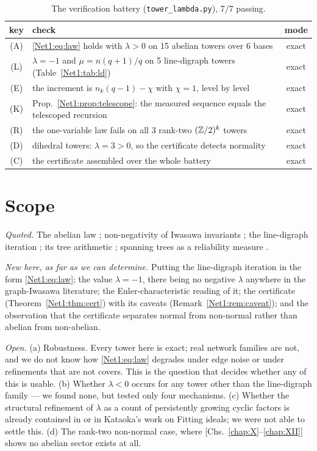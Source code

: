 \begin{table}[ht]
\centering\small
\begin{tabular}{clc}
\toprule
key & check & mode\\
\midrule
(A) & \eqref{Net1:eq:law} holds with $\lambda>0$ on 15 abelian towers over 6 bases & exact\\
(L) & $\lambda=-1$ and $\mu=n(q{+}1)/q$ on 5 line-digraph towers (Table~\ref{Net1:tab:ld}) & exact\\
(E) & the increment is $n_k(q-1)-\chi$ with $\chi=1$, level by level & exact\\
(K) & Prop.~\ref{Net1:prop:telescope}: the measured sequence equals the telescoped recursion & exact\\
(R) & the one-variable law fails on all 3 rank-two $(\mathbb{Z}/2)^{k}$ towers & exact\\
(D) & dihedral towers: $\lambda=3>0$, so the certificate detects normality & exact\\
(C) & the certificate assembled over the whole battery & exact\\
\bottomrule
\end{tabular}
\caption{The verification battery (\texttt{tower\_lambda.py}), $7/7$ passing.}
\label{Net1:tab:battery}
\end{table}

\section{Scope}\label{Net1:sec:scope}

\emph{Quoted.} The abelian law \cite{Val21,MV24,Gonet22,KM24}; non-negativity of Iwasawa
invariants \cite{Washington}; the line-digraph iteration \cite{FAY83,FYA84}; its
tree arithmetic \cite{Knuth67,Levine11,BK11,CHP15}; spanning trees as a reliability measure
\cite{Boesch86,Colbourn87,BH09}.

\emph{New here, as far as we can determine.} Putting the line-digraph iteration in the form
\eqref{Net1:eq:law}; the value $\lambda=-1$, there being no negative $\lambda$ anywhere in the
graph-Iwasawa literature; the Euler-characteristic reading of it; the certificate
(Theorem~\ref{Net1:thm:cert}) with its caveats (Remark~\ref{Net1:rem:caveat}); and the observation
that the certificate separates normal from non-normal rather than abelian from non-abelian.

\emph{Open.} (a) Robustness. Every tower here is exact; real network families are not, and
we do not know how \eqref{Net1:eq:law} degrades under edge noise or under refinements that are
not covers. This is the question that decides whether any of this is usable. (b) Whether
$\lambda<0$ occurs for any tower other than the line-digraph family --- we found none, but
tested only four mechanisms. (c) Whether the structural refinement of $\lambda$ as a count
of persistently growing cyclic factors is already contained in \cite{Gonet22} or in
Kataoka's work on Fitting ideals; we were not able to settle this. (d) The rank-two
non-normal case, where [Chs.~\ref{chap:X}--\ref{chap:XII}] shows no abelian sector exists at all.

